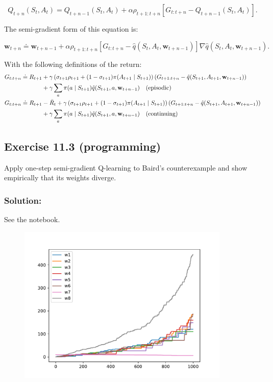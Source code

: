 \[
    Q_{t+n}(S_t, A_t) = Q_{t+n-1}(S_t, A_t) + \alpha \rho_{t+1:t+n} [G_{t:t+n} - Q_{t+n-1}(S_t, A_t)].
\]

The semi-gradient form of this equation is:

\[
    \mathbf{w}_{t+n} \doteq \mathbf{w}_{t+n-1} + \alpha \rho_{t+1:t+n}\left[G_{t:t+n} - \hat{q}(S_t, A_t, \mathbf{w}_{t+n-1})\right]\nabla \hat{q}(S_t,A_t,\mathbf{w}_{t+n-1}).
\]

With the following definitions of the return:
{\scriptsize 
\begin{align*}
    G_{t:t+n} \doteq R_{t+1} &+ \gamma \left( \sigma_{t+1} \rho_{t+1} + (1 - \sigma_{t+1}) \pi(A_{t+1} \mid S_{t+1}) \right) \left( G_{t+1:t+n} - \hat{q}(S_{t+1}, A_{t+1},\mathbf{w}_{t+n-1}) \right) \\
    &+ \gamma \sum_a \pi(a \mid S_{t+1}) \hat{q}(S_{t+1}, a,\mathbf{w}_{t+n-1}) \text{\quad (episodic)}\\
    G_{t:t+n} \doteq R_{t+1} &- \bar{R}_{t} + \gamma \left( \sigma_{t+1} \rho_{t+1} + (1 - \sigma_{t+1}) \pi(A_{t+1} \mid S_{t+1}) \right) \left( G_{t+1:t+n} - \hat{q}(S_{t+1}, A_{t+1},\mathbf{w}_{t+n-1}) \right) \\
    &+ \gamma \sum_a \pi(a \mid S_{t+1}) \hat{q}(S_{t+1}, a,\mathbf{w}_{t+n-1}) \text{\quad (continuing)}
\end{align*}
}
\subsection*{Exercise 11.3 (programming)}

Apply one-step semi-gradient Q-learning to Baird's counterexample and show empirically that its weights diverge. 

\subsubsection*{Solution:}
See the notebook.
\begin{figure}[H]
    \centering
    \includegraphics[width=0.9\textwidth]{chapters_latex/figures/ex_11_03.pdf}
    \captionsetup{labelformat=empty}
\end{figure}

